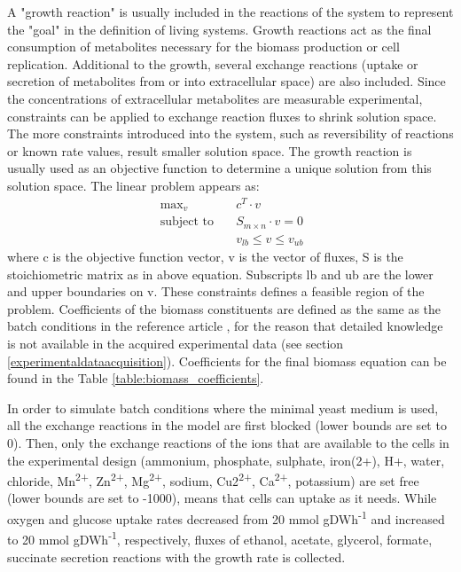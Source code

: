 A "growth reaction" is usually included in the reactions of the system to represent the "goal" in the definition of living systems. Growth reactions act as the final consumption of metabolites necessary for the biomass production or cell replication. Additional to the growth, several exchange reactions (uptake or secretion of metabolites from or into extracellular space) are also included. Since the concentrations of extracellular metabolites are measurable experimental, constraints can be applied to exchange reaction fluxes to shrink solution space. The more constraints introduced into the system, such as reversibility of reactions or known rate values, result smaller solution space. The growth reaction is usually used as an objective function to determine a unique solution from this solution space. The linear problem appears as:
\begin{align}
 \ \text{max}_v \quad & c^T \cdot v \\
 \label{eq:fba}
 \ \text{subject to} \quad & S_{m \times n} \cdot v=0 \\
 \ & v_{lb} \leq v \leq v_{ub}
\end{align}
\noindent where c is the objective function vector, v is the vector of fluxes, S is the stoichiometric matrix as in above equation. Subscripts lb and ub are the lower and upper boundaries on v. These constraints defines a feasible region of the problem. Coefficients of the biomass constituents are defined as the same as the batch conditions in the reference article \cite{nilsson2016metabolic}, for the reason that detailed knowledge is not available in the acquired experimental data (see section \ref{experimentaldataacquisition}). Coefficients for the final biomass equation can be found in the Table \ref{table:biomass_coefficients}.



In order to simulate batch conditions where the minimal yeast medium is used, all the exchange reactions in the model are first blocked (lower bounds are set to 0). Then, only the exchange reactions of the ions that are available to the cells in the experimental design (ammonium, phosphate, sulphate, iron(2+), H+, water, chloride, Mn\textsuperscript{2+}, Zn\textsuperscript{2+}, Mg\textsuperscript{2+}, sodium, Cu2\textsuperscript{2+}, Ca\textsuperscript{2+}, potassium) are set free (lower bounds are set to -1000), means that cells can uptake as it needs. While oxygen and glucose uptake rates decreased from 20 mmol gDWh\textsuperscript{-1} and increased to 20 mmol gDWh\textsuperscript{-1}, respectively, fluxes of ethanol, acetate, glycerol, formate, succinate secretion reactions with the growth rate is collected.


